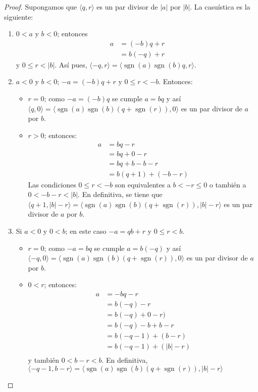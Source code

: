 \begin{proof}
  Supongamos que $\langle q,r\rangle$ es un par divisor de $|a|$ por
  $|b|$. La casuística es la siguiente:
  \begin{enumerate}
  \item $0<a$ y $b<0$; entonces 
    \begin{align*}
      a&=(-b)q+r\\
       &=b(-q)+r
    \end{align*}
    y $0\leq r<|b|$. Así pues,
    $\langle
    -q,r\rangle=\langle\operatorname{sgn}(a)\operatorname{sgn}(b)q,r\rangle$.
  \item $a<0$ y $b<0$; $-a=(-b)q+r$ y $0\leq r<-b$. Entonces:
    \begin{itemize}
    \item $r=0$; como $-a=(-b)q$ se cumple $a=bq$ y así
      $\langle q,0\rangle =
      \langle\operatorname{sgn}(a)\operatorname{sgn}(b)(q+\operatorname{sgn}(r)),0\rangle$
      es un par divisor de $a$ por $b$.
    \item $r>0$; entonces:
      \begin{align*}
        a&=bq-r\\
         &=bq+0-r\\
         &=bq+b-b-r\\
         &=b(q+1)+(-b-r)
      \end{align*}
      Las condiciones $0\leq r<-b$ son equivalentes a $b<-r\leq 0$ o
      también a $0<-b-r<|b|$. En definitiva, se tiene que
      $\langle q+1,|b|-r\rangle
      =\langle\operatorname{sgn}(a)\operatorname{sgn}(b)(q+\operatorname{sgn}(r)),|b|-r\rangle$
      es un par divisor de $a$ por $b$.
    \end{itemize}
  \item Si $a<0$ y $0<b$; en este caso $-a=qb+r$ y $0\leq r<b$.
    \begin{itemize}
    \item $r=0$; como $-a=bq$ se cumple $a=b(-q)$ y así
      $\langle -q,0\rangle =
      \langle\operatorname{sgn}(a)\operatorname{sgn}(b)(q+\operatorname{sgn}(r)),0\rangle$
      es un par divisor de $a$ por $b$.
    \item $0<r$; entonces:
      \begin{align*}
        a&=-bq-r\\
         &=b(-q)-r\\
         &=b(-q)+0-r)\\
         &=b(-q)-b+b-r\\
         &=b(-q-1)+(b-r)\\
         &=b(-q-1)+(|b|-r)\\
      \end{align*}
      y también $0<b-r<b$. En definitiva, $\langle -q-1,b-r\rangle =
      \langle\operatorname{sgn}(a)\operatorname{sgn}(b)(q+\operatorname{sgn}(r)),|b|-r\rangle$
    \end{itemize}
  \end{enumerate}
\end{proof}

